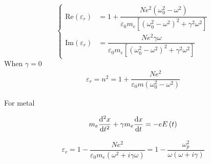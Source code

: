 \begin{equation*}
  \left\{
  \begin{aligned}
    \mathrm{Re} \left( \varepsilon_{r} \right) &= 1 + \dfrac{N e^2 \left( \omega_0^2 - \omega^2 \right)}{\varepsilon_0 m_e \left[ \left( \omega_0^2 - \omega^2 \right)^2 + \gamma^2 \omega^2 \right]}  \\
    \mathrm{Im} \left( \varepsilon_{r} \right) &= \dfrac{N e^2 \gamma \omega}{\varepsilon_0 m_e \left[ \left( \omega_0^2 - \omega^2 \right)^2 + \gamma^2 \omega^2 \right]}  
  \end{aligned}
  \right.
\end{equation*}
When $\gamma = 0$
\begin{equation*}
  \begin{aligned}
    \varepsilon_r = n^2 = 1 + \dfrac{N e^2}{\varepsilon_0 m \left( \omega_0^2 - \omega^2 \right)} 
  \end{aligned}
\end{equation*}

For metal

\begin{equation*}
  \begin{aligned}
    m_e \dfrac{\mathop{}\!\mathrm{d} ^2 x}{\mathop{}\!\mathrm{d} t^2} + \gamma m_e \dfrac{\mathop{}\!\mathrm{d} x}{\mathop{}\!\mathrm{d} t} = - e E \left( t \right)
  \end{aligned}
\end{equation*}

\begin{equation*}
  \begin{aligned}
    \varepsilon_r = 1 - \dfrac{N e^2}{\varepsilon_0 m_e \left(\omega^2 + i \gamma \omega \right)} = 1 - \dfrac{\omega_p^2}{\omega \left( \omega + i \gamma \right)}  
  \end{aligned}
\end{equation*}

